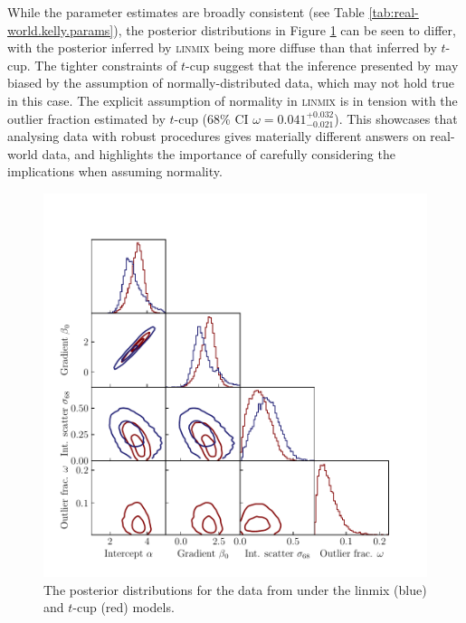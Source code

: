 \documentclass[fleqn,usenatbib]{mnras}
\begin{document}
While the parameter estimates are broadly consistent (see Table
\ref{tab:real-world.kelly.params}), the posterior distributions in Figure
\ref{fig:real-world.kelly.corner} can be seen to differ, with the posterior
inferred by \textsc{linmix} being more diffuse than that inferred by $t$-cup.
The tighter constraints of $t$-cup suggest that the inference presented by
\citet{Kelly:2007} may biased by the assumption of normally-distributed data,
which may not hold true in this case.
The explicit assumption of normality in \textsc{linmix} is in tension with the
outlier fraction estimated by $t$-cup (68\% CI $\omega =
0.041^{+0.032}_{-0.021}$). This showcases that analysing data with robust
procedures gives materially different answers on real-world data, and highlights
the importance of carefully considering the implications when assuming
normality.

\begin{figure}
    \includegraphics[width=\columnwidth]{graphics/corner_kelly.pdf}
    \caption{The posterior distributions for the data from \citet{Kelly:2007}
    under the linmix (blue) and $t$-cup (red) models.}
    \label{fig:real-world.kelly.corner}
\end{figure}

\subsection{\citet{Park:2017}}
\end{document}
